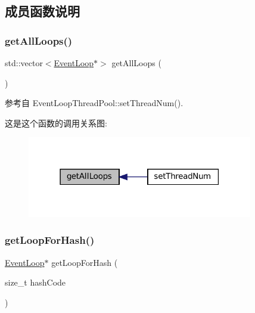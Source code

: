 \subsection{成员函数说明}
\mbox{\label{classmuduo_1_1net_1_1EventLoopThreadPool_a391f930ad84edb52bf75a36c9926b273}} 
\subsubsection{\texorpdfstring{get\+All\+Loops()}{getAllLoops()}}
{\footnotesize\ttfamily std\+::vector$<$\hyperlink{classmuduo_1_1net_1_1EventLoop}{Event\+Loop}$\ast$$>$ get\+All\+Loops (\begin{DoxyParamCaption}{ }\end{DoxyParamCaption})}



参考自 Event\+Loop\+Thread\+Pool\+::set\+Thread\+Num().

这是这个函数的调用关系图\+:
\nopagebreak
\begin{figure}[H]
\begin{center}
\leavevmode
\includegraphics[width=279pt]{classmuduo_1_1net_1_1EventLoopThreadPool_a391f930ad84edb52bf75a36c9926b273_icgraph}
\end{center}
\end{figure}
\mbox{\label{classmuduo_1_1net_1_1EventLoopThreadPool_a7aeeb1513af12dbff3370e780589fb3f}} 
\subsubsection{\texorpdfstring{get\+Loop\+For\+Hash()}{getLoopForHash()}}
{\footnotesize\ttfamily \hyperlink{classmuduo_1_1net_1_1EventLoop}{Event\+Loop}$\ast$ get\+Loop\+For\+Hash (\begin{DoxyParamCaption}\item[{size\+\_\+t}]{hash\+Code }\end{DoxyParamCaption})}



